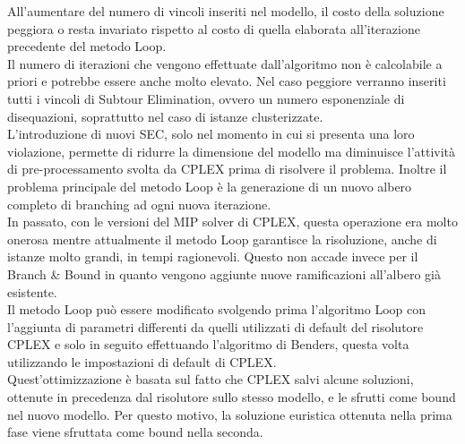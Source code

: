 \vspace{0.5 cm}
All'aumentare del numero di vincoli inseriti nel modello, il costo della soluzione peggiora o resta invariato rispetto al costo di quella elaborata all'iterazione precedente del metodo Loop.\\
Il numero di iterazioni che vengono effettuate dall'algoritmo non è calcolabile a priori e potrebbe essere anche molto elevato. Nel caso peggiore verranno inseriti tutti i vincoli di Subtour Elimination, ovvero un numero esponenziale di disequazioni, soprattutto nel caso di istanze clusterizzate.\\
L'introduzione di nuovi SEC, solo nel momento in cui si presenta una loro violazione, permette di ridurre la dimensione del modello ma diminuisce l'attività di pre-processamento svolta da CPLEX prima di risolvere il problema. Inoltre il problema principale del metodo Loop è la generazione di un nuovo albero completo di branching ad ogni nuova iterazione.\\
In passato, con le versioni del MIP solver di CPLEX, questa operazione era molto onerosa mentre attualmente il metodo Loop garantisce la risoluzione, anche di istanze molto grandi, in tempi ragionevoli. Questo non accade invece per il Branch \& Bound in quanto vengono aggiunte nuove ramificazioni all'albero già esistente.\\
Il metodo Loop può essere modificato svolgendo prima l'algoritmo Loop con l'aggiunta di parametri differenti da quelli utilizzati di default del risolutore CPLEX e solo in seguito effettuando l'algoritmo di Benders, questa volta utilizzando le impostazioni di default di CPLEX. \\
Quest'ottimizzazione è basata sul fatto che CPLEX salvi alcune soluzioni, ottenute in precedenza dal risolutore sullo stesso modello, e le sfrutti come bound nel nuovo modello. Per questo motivo, la soluzione euristica ottenuta nella prima fase viene sfruttata come bound nella seconda.

